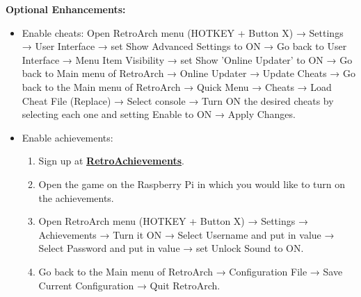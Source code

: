 \vspace{0.5cm}

\noindent \textbf{Optional Enhancements:}
\begin{itemize}

\item Enable cheats: Open RetroArch menu (HOTKEY + Button X) → Settings → User Interface → set Show Advanced Settings to ON → Go back to User Interface → Menu Item Visibility → set Show 'Online Updater' to ON → Go back to Main menu of RetroArch → Online Updater → Update Cheats → Go back to the Main menu of RetroArch → Quick Menu → Cheats → Load Cheat File (Replace) → Select console → Turn ON the desired cheats by selecting each one and setting Enable to ON → Apply Changes.

\item Enable achievements:
\begin{enumerate}
\item Sign up at \href{https://retroachievements.org}{\textbf{\color{blue}RetroAchievements}}.
\item Open the game on the Raspberry Pi in which you would like to turn on the achievements.
\item Open RetroArch menu (HOTKEY + Button X) → Settings → Achievements → Turn it ON → Select Username and put in value → Select Password and put in value → set Unlock Sound to ON.
\item Go back to the Main menu of RetroArch → Configuration File → Save Current Configuration → Quit RetroArch.
\end{enumerate}

\end{itemize}